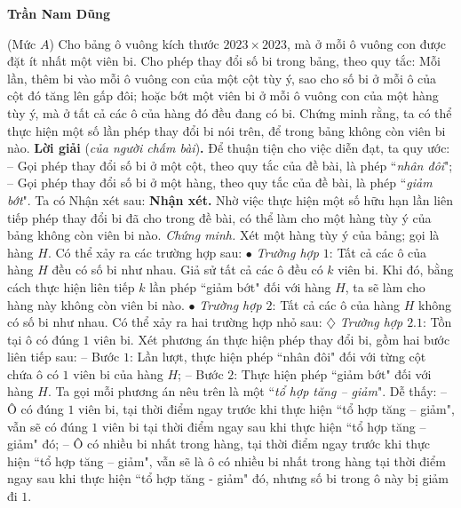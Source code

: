 \begin{multicols}{2}
\begin{flushright}
		\textbf{\color{thachthuctoanhoc}Trần Nam Dũng}
	\end{flushright}
	{}
	(Mức $A$) Cho bảng ô vuông kích thước $2023 \times 2023$, mà ở mỗi ô vuông con được đặt ít nhất một viên bi. Cho phép thay đổi số bi trong bảng, theo quy tắc: Mỗi lần, thêm bi vào mỗi ô vuông con của một cột tùy ý, sao cho số bi ở mỗi ô của cột đó tăng lên gấp đôi; hoặc bớt một viên bi ở mỗi ô vuông con của một hàng tùy ý, mà ở tất cả các ô của hàng đó đều đang có bi. Chứng minh rằng, ta có thể thực hiện một số lần phép thay đổi bi nói trên, để trong bảng không còn viên bi nào.
	\vskip 0.05cm
	\textbf{\color{thachthuctoanhoc}Lời giải} (\textit{của người chấm bài})\textbf{\color{thachthuctoanhoc}.}
	\vskip 0.05cm
	Để thuận tiện cho việc diễn đạt, ta quy ước:
	\vskip 0.05cm
	-- Gọi phép thay đổi số bi ở một cột, theo quy tắc của đề bài, là phép ``\textit{nhân đôi}";
	\vskip 0.05cm
	-- Gọi phép thay đổi số bi ở một hàng, theo quy tắc của đề bài, là phép ``\textit{giảm bớt}".
	\vskip 0.05cm
	Ta có Nhận xét sau:
	\vskip 0.05cm
	\textbf{\color{thachthuctoanhoc}Nhận xét.} Nhờ việc thực hiện một số hữu hạn lần liên tiếp phép thay đổi bi đã cho trong đề bài, có thể làm cho một hàng tùy ý của bảng không còn viên bi nào.
	\vskip 0.05cm
	\textit{Chứng minh.}
	\vskip 0.05cm
	Xét một hàng tùy ý của bảng; gọi là hàng $H$. Có thể xảy ra các trường hợp sau:
	\vskip 0.05cm
	$\bullet$ \textit{Trường hợp $1$}: Tất cả các ô của hàng $H$ đều có số bi như nhau.
	\vskip 0.05cm
	Giả sử tất cả các ô đều có $k$ viên bi.
	\vskip 0.05cm
	Khi đó, bằng cách thực hiện liên tiếp $k$ lần phép ``giảm bớt" đối với hàng $H$, ta sẽ làm cho hàng này không còn viên bi nào.
	\vskip 0.05cm
	$\bullet$ \textit{Trường hợp $2$}: Tất cả các ô của hàng $H$ không có số bi như nhau.
	\vskip 0.05cm
	Có thể xảy ra hai trường hợp nhỏ sau:
	\vskip 0.05cm
	$\diamondsuit$\textit{ Trường hợp $2.1$}: Tồn tại ô có đúng $1$ viên bi.
	\vskip 0.05cm
	Xét phương án thực hiện phép thay đổi bi, gồm hai bước liên tiếp sau:
	\vskip 0.05cm
	-- Bước $1$: Lần lượt, thực hiện phép ``nhân đôi" đối với từng cột chứa ô có $1$ viên bi của hàng $H$;
	\vskip 0.05cm
	-- Bước $2$: Thực hiện phép ``giảm bớt" đối với hàng $H$.
	\vskip 0.05cm
	Ta gọi mỗi phương án nêu trên là một ``\textit{tổ hợp tăng -- giảm}".
	\vskip 0.05cm
	Dễ thấy:
	\vskip 0.05cm
	-- Ô có đúng $1$ viên bi, tại thời điểm ngay trước khi thực hiện ``tổ hợp tăng -- giảm", vẫn sẽ có đúng $1$ viên bi tại thời điểm ngay sau khi thực hiện ``tổ hợp tăng -- giảm" đó;
	\vskip 0.05cm
	-- Ô có nhiều bi nhất trong hàng, tại thời điểm ngay trước khi thực hiện ``tổ hợp tăng -- giảm", vẫn sẽ là ô có nhiều bi nhất trong hàng tại thời điểm ngay sau khi thực hiện ``tổ hợp tăng - giảm" đó, nhưng số bi trong ô này bị giảm đi $1$.

\end{multicols}
